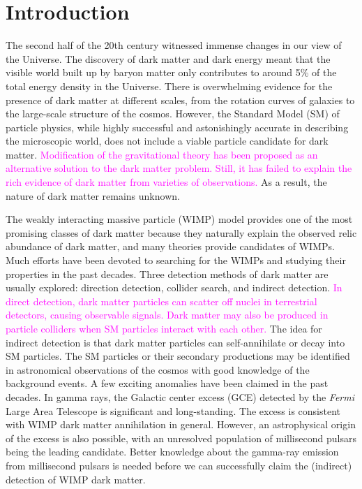 \documentclass[doublespace,nopageskip]{VTthesis} %
\newcommand{\DS}[1]{\textcolor{magenta}{#1}}
\begin{document}



\mainmatter

\chapter{Introduction} \label{ch:introduction}

The second half of the 20th century witnessed immense changes in our view of the Universe. The discovery of dark matter and dark energy meant that the visible world built up by baryon matter only contributes to around 5\% of the total energy density in the Universe. There is overwhelming evidence for the presence of dark matter at different scales, from the rotation curves of galaxies to the large-scale structure of the cosmos. However, the Standard Model (SM) of particle physics, while highly successful and astonishingly accurate in describing the microscopic world, does not include a viable particle candidate for dark matter. \DS{Modification of the gravitational theory has been proposed as an alternative solution to the dark matter problem. Still, it has failed to explain the rich evidence of dark matter from varieties of observations.} As a result, the nature of dark matter remains unknown. 

The weakly interacting massive particle (WIMP) model provides one of the most promising classes of dark matter because they naturally explain the observed relic abundance of dark matter, and many theories provide candidates of WIMPs. Much efforts have been devoted to searching for the WIMPs and studying their properties in the past decades. Three detection methods of dark matter are usually explored: direction detection, collider search, and indirect detection. \DS{In direct detection, dark matter particles can scatter off nuclei in terrestrial detectors, causing observable signals. Dark matter may also be produced in particle colliders when SM particles interact with each other.} The idea for indirect detection is that dark matter particles can self-annihilate or decay into SM particles. The SM particles or their secondary productions may be identified in astronomical observations of the cosmos with good knowledge of the background events. A few exciting anomalies have been claimed in the past decades. In gamma rays, the Galactic center excess (GCE) detected by the \textit{Fermi} Large Area Telescope is significant and long-standing. The excess is consistent with WIMP dark matter annihilation in general. However, an astrophysical origin of the excess is also possible, with an unresolved population of millisecond pulsars being the leading candidate. Better knowledge about the gamma-ray emission from millisecond pulsars is needed before we can successfully claim the (indirect) detection of WIMP dark matter.
\end{document}
